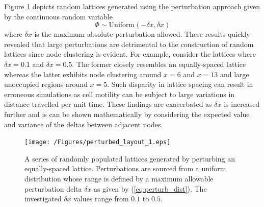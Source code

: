\documentclass[11pt,a4paper]{article}
\begin{document}
			Figure \ref{fig:perturbed_layout_1} depicts random lattices generated using the perturbation approach given by the continuous random variable
			\begin{equation}
				\label{eq:perturb_dist}
				\Phi \sim \text{Uniform}(-\delta x, \delta x)
			\end{equation}
			where $\delta x$ is the maximum absolute perturbation allowed. These results quickly revealed that large perturbations are detrimental to the construction of random lattices since node clustering is evident. For example, consider the lattices where $\delta x = 0.1$ and $\delta x = 0.5$. The former closely resembles an equally-spaced lattice whereas the latter exhibits node clustering around $x = 6$ and $x = 13$ and large unoccupied regions around $x = 5$. Such disparity in lattice spacing can result in erroneous simulations as cell motility can be subject to large variations in distance travelled per unit time. These findings are exacerbated as $\delta x$ is increased further and is can be shown mathematically by considering the expected value and variance of the deltas between adjacent nodes.

			\begin{figure}[tbh]
				\centering
					\texttt{[image: /Figures/perturbed\_layout\_1.eps]}
				\caption{A series of randomly populated lattices generated by perturbing an equally-spaced lattice. Perturbations are sourced from a uniform distribution whose range is defined by a maximum allowable perturbation delta $\delta x$ as given by (\ref{eq:perturb_dist}). The investigated $\delta x$ values range from $0.1$ to $0.5$.}
				\label{fig:perturbed_layout_1}
			\end{figure}
\end{document}
